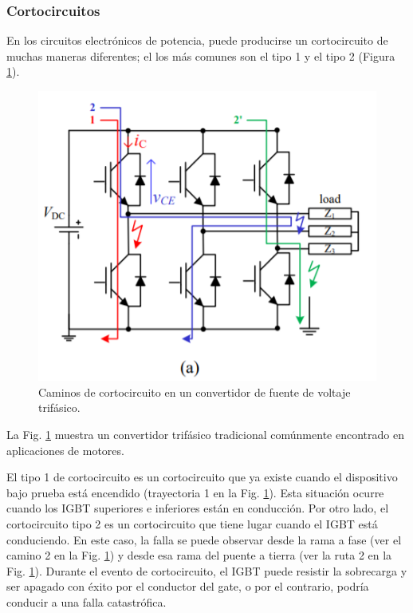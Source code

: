 \documentclass[conference]{IEEEtran}
\begin{document}
\subsubsection{Cortocircuitos}
En los circuitos electrónicos de potencia, puede producirse un cortocircuito de muchas maneras diferentes; el los más comunes son el tipo 1 y el tipo 2 (Figura \ref{fig:sc1}).
\begin{figure}[H]
	\centering
	\includegraphics[width=\columnwidth]{imagenes/sc1}
	\caption{Caminos de cortocircuito en un convertidor de fuente de voltaje trifásico. \cite{sc}}
	\label{fig:sc1}
\end{figure}

La Fig. \ref{fig:sc1} muestra un convertidor trifásico tradicional comúnmente encontrado en aplicaciones de motores. 

El tipo 1 de cortocircuito es un cortocircuito que ya existe cuando el dispositivo bajo prueba está encendido (trayectoria 1 en la Fig. \ref{fig:sc1}). Esta situación ocurre cuando los IGBT superiores e inferiores están en conducción.
 Por otro lado, el cortocircuito tipo 2 es un cortocircuito que tiene lugar cuando el IGBT está conduciendo. En este caso, la falla se puede observar desde la rama a fase (ver el camino 2 en la Fig. \ref{fig:sc1}) y desde esa rama del puente a tierra (ver la ruta 2 en la Fig. \ref{fig:sc1}). Durante el evento de cortocircuito, el IGBT puede resistir la sobrecarga y ser apagado con éxito por el conductor del gate, o por el contrario, podría conducir a una falla catastrófica.
\end{document}
